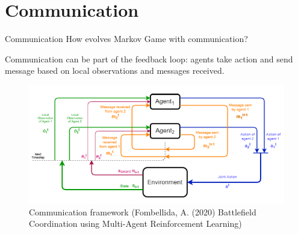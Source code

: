 \documentclass[9pt, hyperref={pdfusetitle,colorlinks=true,allcolors=DarkBlue}]{beamer}
\begin{document}
\section{Communication}
\begin{frame}{Communication}
How evolves Markov Game with communication?

Communication can be part of the feedback loop: agents take action and send message based on local observations and messages received. 

\begin{figure}
    \centering
    \includegraphics[scale=0.45]{com_scheme_1.png}
    \caption{Communication framework (Fombellida, A. (2020) Battlefield Coordination using Multi-Agent Reinforcement Learning)}
\end{figure}
\end{frame}
\end{document}
